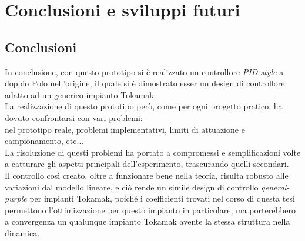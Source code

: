 \chapter{Conclusioni e sviluppi futuri}
\section*{Conclusioni}
In conclusione, con questo prototipo si è realizzato un controllore \textit{PID-style} a doppio Polo nell'origine, il quale si è dimostrato esser un design di controllore adatto ad un generico impianto Tokamak.\\
La realizzazione di questo prototipo però, come per ogni progetto pratico, ha dovuto confrontarsi con vari problemi:\\
\nonLinearita nel prototipo reale, problemi implementativi, limiti di attuazione e campionamento, etc...\\
La risoluzione di questi problemi ha portato a compromessi e semplificazioni volte a catturare gli aspetti principali dell'esperimento, trascurando quelli secondari.\\
Il controllo così creato, oltre a funzionare bene nella teoria, risulta robusto alle variazioni dal modello lineare, e ciò rende un simile design di controllo \textit{general-purple} per impianti Tokamak, poiché i coefficienti trovati nel corso di questa tesi permettono l'ottimizzazione per questo impianto in particolare, ma porterebbero a convergenza un qualunque impianto Tokamak avente la stessa struttura nella dinamica.\\

